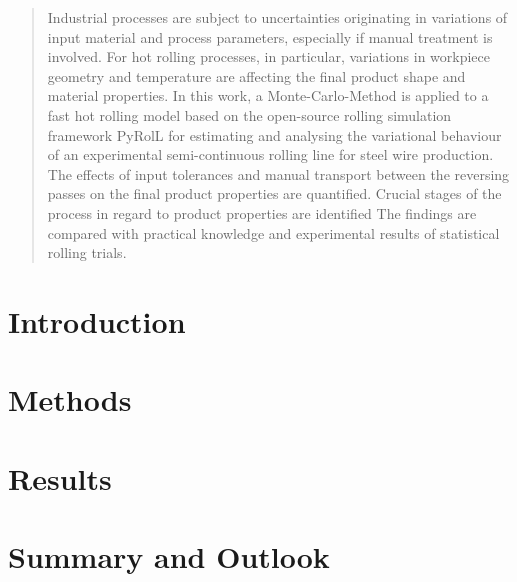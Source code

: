 \documentclass[DIV=13]{scrartcl}
\begin{document}
    \maketitle

    \begin{abstract}
        Industrial processes are subject to uncertainties originating in variations of input material and process parameters,
        especially if manual treatment is involved.
        For hot rolling processes, in particular,
        variations in workpiece geometry and temperature are affecting the final product shape and material properties.
        In this work, a Monte-Carlo-Method is applied to a fast hot rolling model based on the open-source rolling simulation framework PyRolL for estimating and analysing the variational behaviour of an experimental semi-continuous rolling line for steel wire production.
        The effects of input tolerances and manual transport between the reversing passes on the final product properties are quantified.
        Crucial stages of the process in regard to product properties are identified
        The findings are compared with practical knowledge and experimental results of statistical rolling trials.
    \end{abstract}


    \section{Introduction}\label{sec:introduction}

    


    \section{Methods}\label{sec:methods}

    


    \section{Results}\label{sec:results}

    


    \section{Summary and Outlook}\label{sec:summary}
\end{document}
